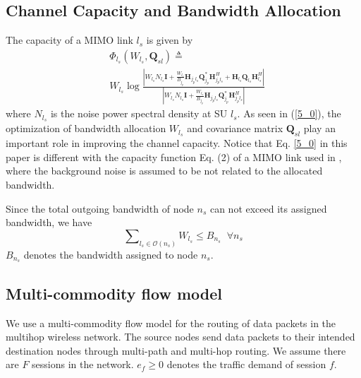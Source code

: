 \documentclass[12pt,onecolumn,tworows]{IEEEtran}
\begin{document}
\subsection{Channel Capacity and Bandwidth Allocation}
The capacity of a MIMO link ${l_s}$ is given by
\begin{equation}\label{5_0}
\begin{split}
   & {\Phi _{{l_s}}}({W_{{l_s}}},{{\mathbf{Q}}_{sl}}) \triangleq  \\
    & {W_{{l_s}}}\log \frac{\left|{{W_{{l_s}}}{N_{{l_s}}}}{\mathbf{I}} + {\frac{{{W_{{l_s}}}}}{{{B_{{j_p}}}}}}\mathbf{H}_{j_pl_s}\mathbf{Q}_{j_p}^{*}\mathbf{H}_{j_pl_s}^{H} + {{\mathbf{H}}_{{l_s}}}{{\mathbf{Q}}_{{l_s}}}{\mathbf{H}}_{{l_s}}^H \right|}{\left|{{W_{{l_s}}}{N_{{l_s}}}}\mathbf{I} + {\frac{{{W_{{l_s}}}}}{{{B_{{j_p}}}}}}\mathbf{H}_{j_pl_s}\mathbf{Q}_{j_p}^{*}\mathbf{H}_{j_pl_s}^{H} \right|}
\end{split}
\end{equation}
where $N_{{l_s}}$ is the noise power spectral density at SU $l_s$.
As seen in (\ref{5_0}), the optimization of bandwidth allocation ${W_{{l_s}}}$ and covariance matrix ${{\mathbf{Q}}_{sl}}$ play an important role in improving the channel capacity.
Notice that Eq. \eqref{5_0}  in this paper is different with the capacity function Eq. (2) of a MIMO link used in \cite{LiuJSAC2008},
where the background noise is assumed to be not related to the allocated bandwidth.

Since the total outgoing bandwidth of node ${n_s}$ can not exceed its assigned bandwidth, we have
\begin{equation}\label{5B}
\sum\nolimits_{{l_s} \in \mathcal{O}({n_s})} {{W_{{l_s}}} \leqslant {B_{{n_s}}}}\;\; \forall {n_s}
\end{equation}
${B_{{n_s}}}$ denotes the bandwidth assigned to node ${n_s}$.






 \subsection{Multi-commodity flow model}

 We use a multi-commodity flow model for the routing of data packets in the multihop wireless network. The source nodes send data packets to their intended destination nodes through multi-path and multi-hop routing. We assume there are $F$ sessions in the network. $e_f\geq0$ denotes the traffic demand of session $f$.
\end{document}
